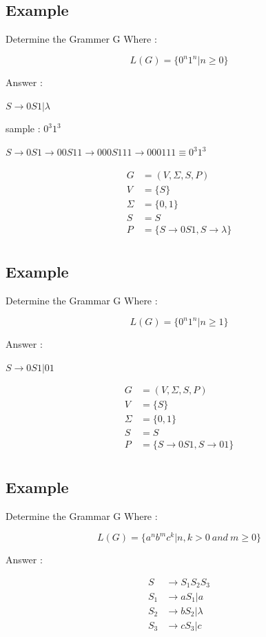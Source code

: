 \documentclass[12pt]{book}
\begin{document}
\subsection{Example}

Determine the Grammer G Where :

$$
L(G) = \{ 0^{n} 1 ^{n} | n \geq 0 \}
$$

Answer :

$ S \to 0S1 | \lambda $

sample : $0^{3} 1 ^{3}$

$S \to 0S1 \to 00S11 \to 000S111 \to 000111 \equiv 0^{3} 1 ^{3}$

\begin{align*}
G &= (V, \Sigma, S, P) \\
V &= \{ S \} \\
\Sigma &= \{ 0, 1 \} \\
S &= S \\
P &= \{ S \to 0S1 , S \to \lambda \}  \\
\end{align*}


\subsection{Example}

Determine the Grammar G Where :

$$
L(G) = \{ 0^{n} 1 ^{n} | n \geq 1 \}
$$

Answer :

$ S \to 0S1 | 01 $


\begin{align*}
G &= (V, \Sigma, S, P) \\
V &= \{ S \} \\
\Sigma &= \{ 0, 1 \} \\
S &= S \\
P &= \{ S \to 0S1 , S \to 01 \}  \\
\end{align*}


\subsection{Example}

Determine the Grammar G Where :

$$
L(G) = \{ a^{n} b ^{m} c ^{k} | n , k > 0 \: and \: m \geq 0 \}
$$

Answer :

\begin{align*}
 S &\to S_{1}S_{2}S_{3} \\
 S_{1} &\to aS_{1} | a  \\
 S_{2} &\to bS_{2} | \lambda  \\
 S_{3} &\to cS_{3} | c \\
\end{align*}
\end{document}
